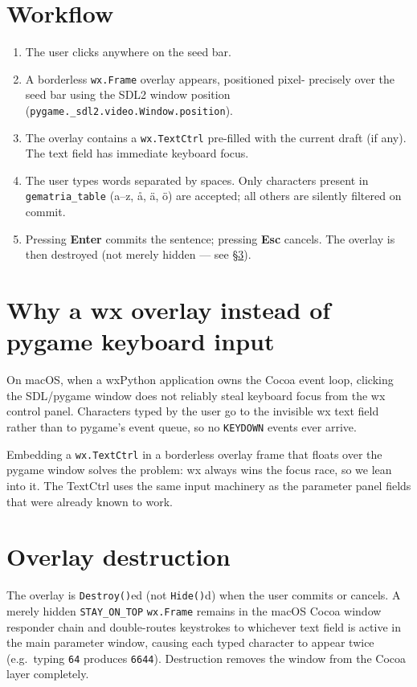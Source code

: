 \documentclass[11pt,a4paper]{report}
\begin{document}
\section{Workflow}

\begin{enumerate}
  \item The user clicks anywhere on the seed bar.
  \item A borderless \texttt{wx.Frame} overlay appears, positioned pixel-
        precisely over the seed bar using the SDL2 window position
        (\texttt{pygame.\_sdl2.video.Window.position}).
  \item The overlay contains a \texttt{wx.TextCtrl} pre-filled with the
        current draft (if any).  The text field has immediate keyboard focus.
  \item The user types words separated by spaces.  Only characters present in
        \texttt{gematria\_table} (a–z, å, ä, ö) are accepted; all others are
        silently filtered on commit.
  \item Pressing \textbf{Enter} commits the sentence; pressing \textbf{Esc}
        cancels.  The overlay is then destroyed (not merely hidden — see
        §\ref{sec:overlay-destroy}).
\end{enumerate}

\section{Why a wx overlay instead of pygame keyboard input}
\label{sec:focus}

On macOS, when a wxPython application owns the Cocoa event loop, clicking
the SDL/pygame window does not reliably steal keyboard focus from the wx
control panel.  Characters typed by the user go to the invisible wx text
field rather than to pygame's event queue, so no \texttt{KEYDOWN} events
ever arrive.

Embedding a \texttt{wx.TextCtrl} in a borderless overlay frame that floats
over the pygame window solves the problem: wx always wins the focus race, so
we lean into it.  The TextCtrl uses the same input machinery as the parameter
panel fields that were already known to work.

\section{Overlay destruction}
\label{sec:overlay-destroy}

The overlay is \texttt{Destroy()}ed (not \texttt{Hide()}d) when the user
commits or cancels.  A merely hidden \texttt{STAY\_ON\_TOP} \texttt{wx.Frame}
remains in the macOS Cocoa window responder chain and double-routes keystrokes
to whichever text field is active in the main parameter window, causing each
typed character to appear twice (e.g.\ typing \texttt{64} produces
\texttt{6644}).  Destruction removes the window from the Cocoa layer
completely.
\end{document}
